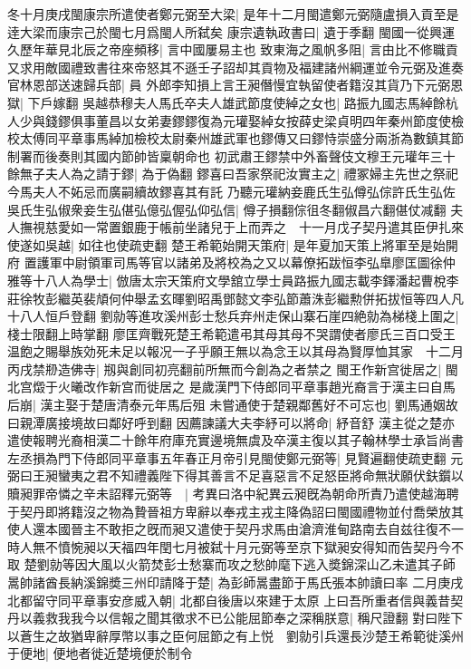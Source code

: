 冬十月庚戌閩康宗所遣使者鄭元弼至大梁|{
	是年十二月閩遣鄭元弼隨盧損入貢至是逹大梁而康宗己於閩七月爲閩人所弑矣}
康宗遺執政書曰|{
	遺于季翻}
閩國一從興運久歷年華見北辰之帝座頻移|{
	言中國屢易主也}
致東海之風帆多阻|{
	言由比不修職貢}
又求用敵國禮致書往來帝怒其不遜壬子詔却其貢物及福建諸州綱運並令元弼及進奏官林恩部送速歸兵部|{
	員}
外郎李知損上言王昶僭慢宜執留使者籍沒其貨乃下元弼恩獄|{
	下戶嫁翻}
吳越恭穆夫人馬氏卒夫人雄武節度使綽之女也|{
	路振九國志馬綽餘杭人少與錢鏐俱事董昌以女弟妻鏐鏐復為元瓘娶綽女按薛史梁貞明四年秦州節度使檢校太傅同平章事馬綽加檢校太尉秦州雄武軍也鏐傳又曰鏐恃崇盛分兩浙為數鎮其節制署而後奏則其國内節帥皆稟朝命也}
初武肅王鏐禁中外畜聲伎文穆王元瓘年三十餘無子夫人為之請于鏐|{
	為于偽翻}
鏐喜曰吾家祭祀汝實主之|{
	禮冢婦主先世之祭祀今馬夫人不妬忌而廣嗣續故鏐喜其有託}
乃聽元瓘納妾鹿氏生弘僔弘倧許氏生弘佐吳氏生弘俶衆妾生弘偡弘億弘偓弘仰弘信|{
	僔子損翻倧徂冬翻俶昌六翻偡仗减翻}
夫人撫視慈愛如一常置銀鹿于帳前坐諸兒于上而弄之　十一月戊子契丹遣其臣伊扎來使遂如吳越|{
	如往也使疏吏翻}
楚王希範始開天策府|{
	是年夏加天策上將軍至是始開府}
置護軍中尉領軍司馬等官以諸弟及將校為之又以幕僚拓跋恒李弘臯廖匡圖徐仲雅等十八人為學士|{
	倣唐太宗天策府文學舘立學士員路振九國志載李鐸潘起曹梲李莊徐牧彭繼英裴頏何仲舉孟玄暉劉昭禹鄧懿文李弘節蕭洙彭繼勲併拓拔恒等四人凡十八人恒戶登翻}
劉勍等進攻溪州彭士愁兵弃州走保山寨石崖四絶勍為梯棧上圍之|{
	棧士限翻上時掌翻}
廖匡齊戰死楚王希範遣弔其母其母不哭謂使者廖氏三百口受王温飽之賜舉族効死未足以報况一子乎願王無以為念王以其母為賢厚恤其家　十二月丙戌禁剙造佛寺|{
	剏與創同初亮翻前所無而今創為之者禁之}
閩王作新宫徙居之|{
	閩北宫燬于火曦改作新宫而徙居之}
是歲漢門下侍郎同平章事趙光裔言于漢主曰自馬后崩|{
	漢主娶于楚唐清泰元年馬后殂}
未嘗通使于楚親鄰舊好不可忘也|{
	劉馬通姻故曰親潭廣接境故曰鄰好呼到翻}
因薦諫議大夫李紓可以將命|{
	紓音舒}
漢主從之楚亦遣使報聘光裔相漢二十餘年府庫充實邊境無虞及卒漢主復以其子翰林學士承旨尚書左丞損為門下侍郎同平章事五年春正月帝引見閩使鄭元弼等|{
	見賢遍翻使疏吏翻}
元弼曰王昶蠻夷之君不知禮義陛下得其善言不足喜惡言不足怒臣將命無狀願伏鈇鑕以贖昶罪帝憐之辛未詔釋元弼等　|{
	考異曰洛中紀異云昶旣為朝命所責乃遣使越海聘于契丹即將籍沒之物為贄晉祖方卑辭以奉戎主戎主降偽詔曰閩國禮物並付喬榮放其使人還本國晉主不敢拒之旣而昶又遣使于契丹求馬由滄濟淮甸路南去自兹往復不一時人無不憤惋昶以天福四年閏七月被弑十月元弼等至京下獄昶安得知而告契丹今不取}
楚劉勍等因大風以火箭焚彭士愁寨而攻之愁帥麾下逃入奬錦深山乙未遣其子師暠帥諸酋長納溪錦奬三州印請降于楚|{
	為彭師暠盡節于馬氏張本帥讀曰率}
二月庚戌北都留守同平章事安彦威入朝|{
	北都自後唐以來建于太原}
上曰吾所重者信與義昔契丹以義救我我今以信報之聞其徵求不已公能屈節奉之深稱朕意|{
	稱尺證翻}
對曰陛下以蒼生之故猶卑辭厚幣以事之臣何屈節之有上悦　劉勍引兵還長沙楚王希範徙溪州于便地|{
	便地者徙近楚境便於制令}
